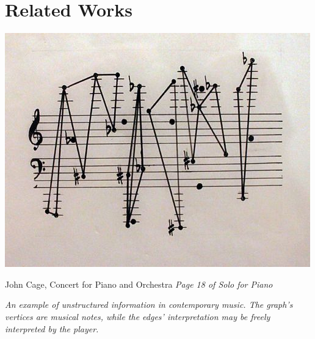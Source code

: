 

\part{Related Works}


\begin{center}
\includegraphics[scale=0.5]{fig/divertissments/johncage-notation.jpg}
\end{center}
\medskip

\begin{center}
John Cage, Concert for Piano and Orchestra \textit{Page 18 of Solo for Piano}\\
\medskip

\textit{An example of unstructured information in contemporary music. The graph's vertices are musical notes, while the edges' interpretation may be freely interpreted by the player.}
\end{center}


